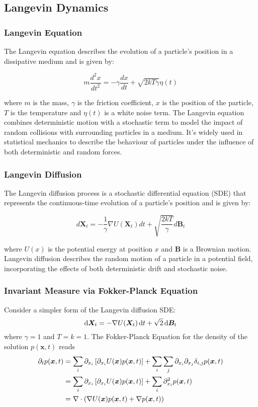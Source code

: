 \subsection{Langevin Dynamics}

\subsubsection{Langevin Equation}
The Langevin equation describes the evolution of a particle's position in a dissipative medium and is given by:

\[
	m \frac{ d^2 x }{ {dt}^2 } = - \gamma \frac{ d x }{ dt } + \sqrt{2 k T \gamma} \eta(t)
\]

where $m$ is the mass, $\gamma$ is the friction coefficient, $x$ is the position of the particle, $T$ is the temperature and $\eta(t)$ is a white noise term.
The Langevin equation combines deterministic motion with a stochastic term to model the impact of random collisions with surrounding particles in a medium. 
It's widely used in statistical mechanics to describe the behaviour of particles under the influence of both deterministic and random forces. 


\subsubsection{Langevin Diffusion}
The Langevin diffusion process is a stochastic differential equation (SDE) that represents the continuous-time evolution of a particle's position and is given by:

\[
	d\bm{X}_t = - \frac{ 1 }{ \gamma } \nabla U(\bm{X}_t) dt + \sqrt{\frac{ 2 k T }{ \gamma }} d\bm{B}_t
\]

where $U(x)$ is the potential energy at position $x$ and $\bm{B}$ is a Brownian motion.
Langevin diffusion describes the random motion of a particle in a potential field, incorporating the effects of both deterministic drift and stochastic noise.


\subsubsection{Invariant Measure via Fokker-Planck Equation} 
Consider a simpler form of the Langevin diffusion SDE:
\[
	\mathop{}\!\mathrm{d} \bm{X}_t = - \nabla U(\bm{X}_t) \mathop{}\!\mathrm{d} t + \sqrt{2} \mathop{}\!\mathrm{d} \bm{B}_t
\]
where $\gamma = 1$ and $T = k = 1$.
The Fokker-Planck Equation for the density of the solution $p(\bm{x}, t)$ reads
\[
\begin{aligned}
	\partial_t p(\bm{x},t) 
	&= \sum_i \partial_{x_i} \left[ \partial_{x_i} U(\bm{x}) p(\bm{x},t) \right] + \sum_i \sum_j \partial_{x_i} \partial_{x_j} \delta_{i,j} p(\bm{x},t) \\
	&= \sum_i \partial_{x_i} \left[ \partial_{x_i} U(\bm{x}) p(\bm{x},t) \right] + \sum_i \partial_{x_i}^2 p(\bm{x},t) \\
	&= \nabla \cdot \left( \nabla U(\bm{x}) p(\bm{x},t) + \nabla p(\bm{x},t) \right) \\
\end{aligned}
\]

